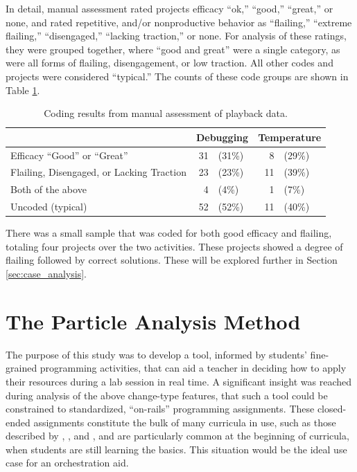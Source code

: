 In detail, manual assessment rated projects efficacy ``ok,'' ``good,'' ``great,'' or none, and rated repetitive, and/or nonproductive behavior as ``flailing,'' ``extreme flailing,'' ``disengaged,'' ``lacking traction,'' or none. For analysis of these ratings, they were grouped together, where ``good and great'' were a single category, as were all forms of flailing, disengagement, or low traction. All other codes and projects were considered ``typical.'' The counts of these code groups are shown in Table \ref{tab:manual-percentages}.

\begin{table}
\begin{centering}
	\begin{tabular}{l rl rl}
													& \multicolumn{2}{c}{Debugging} & \multicolumn{2}{c}{Temperature}  \\ \hline
		Efficacy ``Good'' or ``Great''				& 31 	& (31\%) 	& 8 	& (29\%) 	\\
		Flailing, Disengaged, or Lacking Traction	& 23 	& (23\%)	& 11 	& (39\%)	\\
		Both of the above							& 4 	& (4\%)		& 1 	& (7\%)		\\
		Uncoded	(typical)							& 52 	& (52\%)	& 11	& (40\%)

	\end{tabular}
	\caption[Coding Results from Manual Assessment of Playback Data]{Coding results from manual assessment of playback data.}
	\label{tab:manual-percentages}
\end{centering}
\end{table}

There was a small sample that was coded for both good efficacy and flailing, totaling four projects over the two activities. These projects showed a degree of flailing followed by correct solutions. These will be explored further in Section \ref{sec:case_analysis}.



\section{The Particle Analysis Method}
\label{sec:particle-analysis}

The purpose of this study was to develop a tool, informed by students' fine-grained programming activities, that can aid a teacher in deciding how to apply their resources during a lab session in real time. A significant insight was reached during analysis of the above change-type features, that such a tool could be constrained to standardized, ``on-rails'' programming assignments. These closed-ended assignments constitute the bulk of many curricula in use, such as those described by  \citet{gray2012teaching}, \citet{martin2015dual}, and \citet{morelli2015analyzing}, and are particularly common at the beginning of curricula, when students are still learning the basics. This situation would be the ideal use case for an orchestration aid. 

